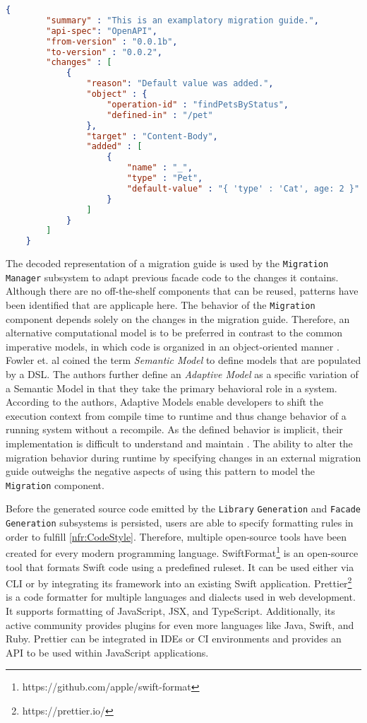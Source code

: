  \vspace{2mm}
 \begin{lstlisting}[language=json, caption={Examplatory migration guide in JSON format}, captionpos=b, label={lst:exampleGuide}]
 	{
 		"summary" : "This is an examplatory migration guide.",
 		"api-spec": "OpenAPI",
 		"from-version" : "0.0.1b",
 		"to-version" : "0.0.2",
 		"changes" : [
	 		{
	 			"reason": "Default value was added.",
	 			"object" : {
	 				"operation-id" : "findPetsByStatus",
	 				"defined-in" : "/pet"
	 			},
	 			"target" : "Content-Body",
	 			"added" : [
		 			{
		 				"name" : "_",
		 				"type" : "Pet",
		 				"default-value" : "{ 'type' : 'Cat', age: 2 }"
		 			}
	 			]
	 		}
 		]
 	}
 \end{lstlisting}
 
The decoded representation of a migration guide is used by the \texttt{Migration} \texttt{Manager} subsystem to adapt previous facade code to the changes it contains. Although there are no off-the-shelf components that can be reused, patterns have been identified that are applicaple here. The behavior of the \texttt{Migration} component depends solely on the changes in the migration guide. Therefore, an alternative computational model is to be preferred in contrast to the common imperative models, in which code is organized in an object-oriented manner \cite{fowler_domain-specific_2011}. Fowler et. al coined the term \textit{Semantic Model} to define models that are populated by a \ac{DSL}.  The authors further define an \textit{Adaptive Model} as a specific variation of a Semantic Model in that they take the primary behavioral role in a system. According to the authors, Adaptive Models enable developers to shift the execution context from compile time to runtime and thus change behavior of a running system without a recompile. As the defined behavior is implicit, their implementation is difficult to understand and maintain \cite{fowler_domain-specific_2011}. The ability to alter the migration behavior during runtime by specifying changes in an external migration guide outweighs the negative aspects of using this pattern to model the \texttt{Migration} component. 

Before the generated source code emitted by the \texttt{Library} \texttt{Generation} and \texttt{Facade} \texttt{Generation} subsystems is persisted, users are able to specify formatting rules in order to fulfill \ref{nfr:CodeStyle}. Therefore, multiple open-source tools have been created for every modern programming language. SwiftFormat\footnote{https://github.com/apple/swift-format} is an open-source tool that formats Swift code using a predefined ruleset. It can be used either via \ac{CLI} or by integrating its framework into an existing Swift application. Prettier\footnote{https://prettier.io/} is a code formatter for multiple languages and dialects used in web development. It supports formatting of JavaScript, JSX, and TypeScript. Additionally, its active community provides plugins for even more languages like Java, Swift, and Ruby. Prettier can be integrated in \acp{IDE} or CI environments and provides an \ac{API} to be used within JavaScript applications. 

